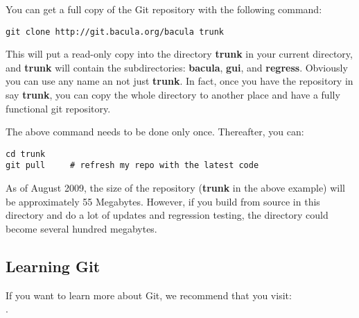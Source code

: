 You can get a full copy of the Git repository with the
following command:

\begin{verbatim}
git clone http://git.bacula.org/bacula trunk
\end{verbatim}

This will put a read-only copy into the directory {\bf trunk} 
in your current directory, and {\bf trunk} will contain
the subdirectories: {\bf bacula}, {\bf gui}, and {\bf regress}.
Obviously you can use any name an not just {\bf trunk}.  In fact,
once you have the repository in say {\bf trunk}, you can copy the
whole directory to another place and have a fully functional
git repository.

The above command needs to be done only once. Thereafter, you can:

\begin{verbatim}
cd trunk
git pull     # refresh my repo with the latest code
\end{verbatim}

As of August 2009, the size of the repository ({\bf trunk} in the above
example) will be approximately 55 Megabytes.  However, if you build
from source in this directory and do a lot of updates and regression
testing, the directory could become several hundred megabytes.

\subsection{Learning Git}
If you want to learn more about Git, we recommend that you visit:\\
.


